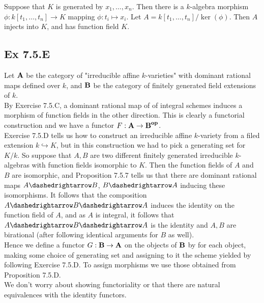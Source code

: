 \documentclass{article}
\theoremstyle{definition}
\newcommand{\catname}[1]{{\normalfont\textbf{#1}}}
\newcommand{\op}{\catname{op}}
\begin{document}
Suppose that $K$ is generated by $x_{1}, \ldots, x_n$. Then there is a
$k$-algebra morphism $\phi : k[t_{1}, \ldots, t_n] \to K$ mapping $\phi : t_{i}
	\mapsto x_{i}$. Let $A = k[t_1, \ldots, t_n]/\ker(\phi)$. Then $A$ injects into
$K$, and has function field $K$.

\subsection*{Ex 7.5.E}

Let $\catname{A}$ be the category of "irreducible affine $k$-varieties" with
dominant rational maps defined over $k$, and $\catname{B}$ be the category of
finitely generated field extensions of $k$. \\

By Exercise 7.5.C, a dominant rational map of of integral schemes induces a
morphism of function fields in the other direction. This is clearly a
functorial construction and we have a functor $F : \catname{A} \to
	\catname{B}^{\op}$. \\

Exercise 7.5.D tells us how to construct an irreducible affine $k$-variety from
a filed extension $k \hookrightarrow K$, but in this construction we had to
pick a generating set for $K/k$. So suppose that $A, B$ are two different
finitely generated irreducible $k$-algebras with function fields isomorphic to
$K$. Then the function fields of $A$ and $B$ are isomorphic, and Proposition
7.5.7 tells us that there are dominant rational maps $A \dashedrightarrow B$,
$B \dashedrightarrow A$ inducing these isomorphisms. It follows that the
composition $A \dashedrightarrow B \dashedrightarrow A$ induces the identity on
the function field of $A$, and as $A$ is integral, it follows that $A
	\dashedrightarrow B \dashedrightarrow A$ is the identity and $A, B$ are
birational (after following identical arguments for $B$ as well). \\

Hence we define a functor $G : \catname{B} \to \catname{A}$ on the objects of
$\catname{B}$ by for each object, making some choice of generating set and
assigning to it the scheme yielded by following Exercise 7.5.D. To assign
morphisms we use those obtained from Proposition 7.5.D. \\

We don't worry about showing functoriality or that there are natural
equivalences with the identity functors. \\
\end{document}
